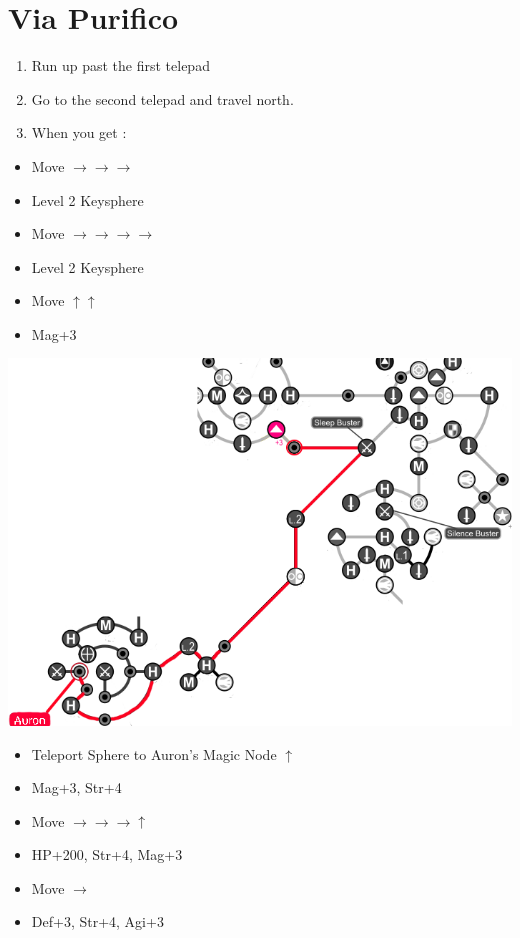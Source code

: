 \chapter{Via Purifico}

\begin{enumerate}
  \item Run up past the first telepad
  \item Go to the second telepad and travel north.
  \item When you get \auron:
\end{enumerate}
\vfill
\begin{spheregrid}
  \begin{itemize}
    \auronf
    \begin{itemize}
      \item Move $\rightarrow\rightarrow\rightarrow$
      \item Level 2 Keysphere
      \item Move $\rightarrow\rightarrow\rightarrow\rightarrow$
      \item Level 2 Keysphere
      \item Move $\uparrow\uparrow$
      \item Mag+3
    \end{itemize}
    \includegraphics[width=.8\columnwidth]{graphics/Auron_Via_Purifico}
    \yunaf
    \begin{itemize}
      \item Teleport Sphere to Auron's Magic Node $\uparrow$
      \item Mag+3, Str+4
      \item Move $\rightarrow\rightarrow\rightarrow\uparrow$
      \item HP+200, Str+4, Mag+3
      \item Move $\rightarrow$
      \item Def+3, Str+4, Agi+3

\end{itemize}
\end{itemize}
\end{spheregrid}
